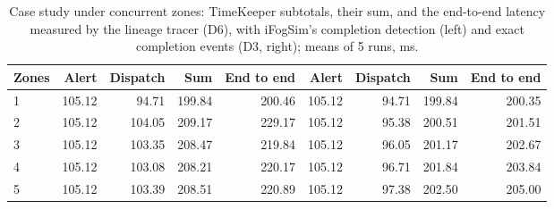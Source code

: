 \begin{table}[htbp]
\centering
\caption{Case study under concurrent zones: TimeKeeper subtotals, their sum, and the end-to-end latency measured by the lineage tracer (D6), with iFogSim's completion detection (left) and exact completion events (D3, right); means of 5 runs, ms.}
\label{tab:concurrency}
\begin{adjustbox}{max width=\textwidth}
\begin{tabular}{lrrrrrrrr}
\toprule
Zones & Alert & Dispatch & Sum & End to end & Alert & Dispatch & Sum & End to end \\
\midrule
1 & 105.12 & 94.71 & 199.84 & 200.46 & 105.12 & 94.71 & 199.84 & 200.35 \\
2 & 105.12 & 104.05 & 209.17 & 229.17 & 105.12 & 95.38 & 200.51 & 201.51 \\
3 & 105.12 & 103.35 & 208.47 & 219.84 & 105.12 & 96.05 & 201.17 & 202.67 \\
4 & 105.12 & 103.08 & 208.21 & 220.17 & 105.12 & 96.71 & 201.84 & 203.84 \\
5 & 105.12 & 103.39 & 208.51 & 220.89 & 105.12 & 97.38 & 202.50 & 205.00 \\
\bottomrule
\end{tabular}
\end{adjustbox}
\end{table}
